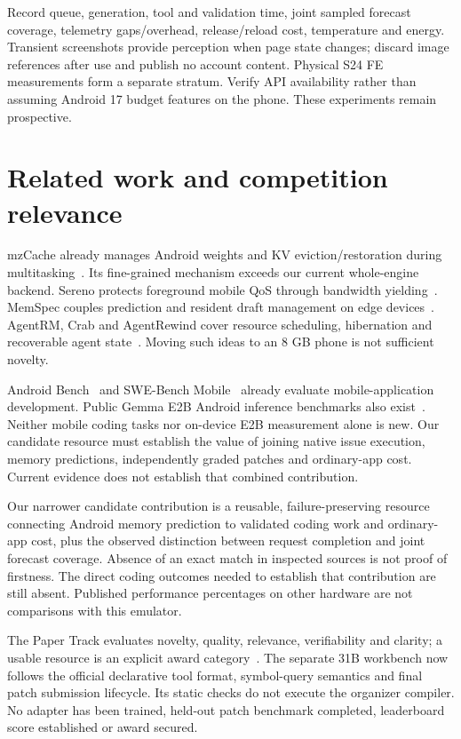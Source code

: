 \documentclass[10pt,twocolumn]{article}
\begin{document}
Record queue, generation, tool and validation time, joint sampled forecast
coverage, telemetry gaps/overhead, release/reload cost, temperature and energy.
Transient screenshots provide perception when page state changes; discard image
references after use and publish no account content. Physical S24 FE measurements
form a separate stratum. Verify API availability rather than assuming Android
17 budget features on the phone. These experiments remain prospective.

\section{Related work and competition relevance}
mzCache already manages Android weights and KV eviction/restoration during
multitasking~\cite{mzcache}. Its fine-grained mechanism exceeds our current
whole-engine backend. Sereno protects foreground mobile QoS through bandwidth
yielding~\cite{sereno}. MemSpec couples prediction and resident draft management
on edge devices~\cite{memspec}. AgentRM, Crab and AgentRewind cover resource
scheduling, hibernation and recoverable agent state~\cite{agentrm,crab,rewind}.
Moving such ideas to an 8 GB phone is not sufficient novelty.

Android Bench~\cite{androidbench} and SWE-Bench Mobile~\cite{swemobile}
already evaluate mobile-application development. Public Gemma E2B Android
inference benchmarks also exist~\cite{lexa}. Neither mobile coding tasks nor
on-device E2B measurement alone is new. Our candidate resource must establish
the value of joining native issue execution, memory predictions, independently
graded patches and ordinary-app cost. Current evidence does not establish that
combined contribution.

Our narrower candidate contribution is a reusable, failure-preserving resource
connecting Android memory prediction to validated coding work and ordinary-app
cost, plus the observed distinction between request completion and joint forecast
coverage. Absence of an exact match in inspected sources is not proof of firstness.
The direct coding outcomes needed to establish that contribution are still absent.
Published performance percentages on other hardware are not comparisons with
this emulator.

The Paper Track evaluates novelty, quality, relevance, verifiability and clarity;
a usable resource is an explicit award category~\cite{papertrack}. The separate
31B workbench now follows the official declarative tool format, symbol-query
semantics and final patch submission lifecycle. Its static checks do not execute
the organizer compiler. No adapter has been trained, held-out patch benchmark
completed, leaderboard score established or award secured.
\end{document}
